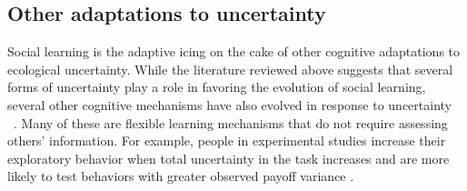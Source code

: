 \documentclass[letterpaper,11.5pt]{scrartcl}
\newcommand{\cm}[1]{{\textcolor{mypurple} {({\tiny CM:} #1)}}}
\begin{document}
\subsection{Other adaptations to uncertainty} 





Social learning is the adaptive icing on the cake of other cognitive adaptations to ecological uncertainty. 
While the literature reviewed above suggests that several forms of uncertainty play a role in favoring the evolution of social learning, several other cognitive mechanisms have also evolved in response to uncertainty ~\cite{volz2012}. Many of these are flexible learning mechanisms that do not require assessing others' information. For example, people in experimental studies increase their exploratory behavior when total uncertainty in the task increases and are more likely to test %
behaviors with greater observed payoff variance \cite{Wilson2014,Gershman2019}.
\end{document}
